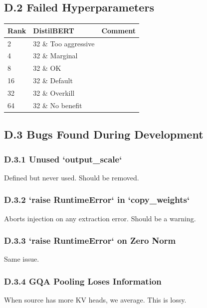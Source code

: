 \subsection{D.2 Failed Hyperparameters}

\begin{table}[H]
\centering
\small
\begin{tabular}{lll}
\toprule
\textbf{Rank} & \textbf{DistilBERT} & \textbf{Comment} \\
\midrule
2 & 32 \& Too aggressive \\
4 & 32 \& Marginal \\
8 & 32 \& OK \\
16 & 32 \& Default \\
32 & 32 \& Overkill \\
64 & 32 \& No benefit \\
\bottomrule
\end{tabular}
\end{table}

\subsection{D.3 Bugs Found During Development}

\subsubsection{D.3.1 Unused `output\_scale`}

Defined but never used. Should be removed.

\subsubsection{D.3.2 `raise RuntimeError` in `copy\_weights`}

Aborts injection on any extraction error. Should be a warning.

\subsubsection{D.3.3 `raise RuntimeError` on Zero Norm}

Same issue.

\subsubsection{D.3.4 GQA Pooling Loses Information}

When source has more KV heads, we average. This is lossy.

